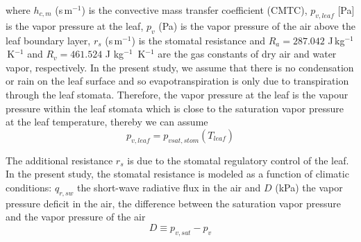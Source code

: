 where $h_{c,m}$ (s\,m$^{-1}$) is the convective mass transfer coefficient (CMTC), $p_{\mathit{v,leaf}}$ [Pa] is the vapor pressure at the leaf, $p_v$ (Pa) is the vapor pressure of the air above the leaf boundary layer, $r_s$ (s\,m$^{-1}$) is the stomatal resistance and $R_a=287.042$ J\,kg$^{-1}$\,K$^{-1}$ and $R_v=\num{461.524}$ J kg$^{-1}$~K$^{-1}$ are the gas constants of dry air and water vapor, respectively. In the present study, we assume that there is no condensation or rain on the leaf surface and so evapotranspiration is only due to transpiration through the leaf stomata. Therefore, the vapor pressure at the leaf is the vapour pressure within the leaf stomata which is close to the saturation vapor pressure at the leaf temperature, thereby we can assume
\begin{equation}
p_{\mathit{v,leaf}}=p_{\mathit{vsat,stom}} \left(T_{\mathit{leaf}}\right)
\end{equation}

The additional resistance $r_s$ is due to the stomatal regulatory control of the leaf. In the present study, the stomatal resistance is modeled as a function of climatic conditions: $q_{\mathit{r,sw}}$ the short-wave radiative flux in the air and $D$ (kPa) the vapor pressure deficit in the air, the difference between the saturation vapor pressure and the vapor pressure of the air
\begin{equation}
D \equiv p_{\mathit{v,sat}} - p_v
\end{equation}

